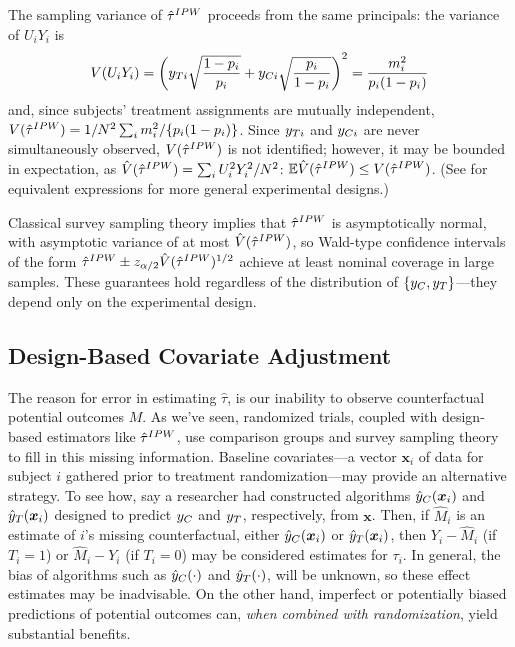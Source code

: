 The sampling variance of $\hat{\tau}^{IPW}$ proceeds from the same principals:
the variance of $U_iY_i$ is
\begin{equation}\label{eq:varTauHat1}
V(U_iY_i)=\left(y_{Ti}\sqrt{\frac{1-p_i}{p_i}}+y_{Ci}\sqrt{\frac{p_i}{1-p_i}}\right)^2=\frac{m_i^2}{p_i(1-p_i)}
\end{equation}
and, since  subjects' treatment assignments are mutually independent,
$V(\hat{\tau}^{IPW})=1/N^2\sum_im_i^2/\{p_i(1-p_i)\}$.
Since $y_{Ti} $ and $y_{Ci} $ are never simultaneously observed,
$V(\hat{\tau}^{IPW})$ is not identified; however, it may be bounded in expectation,
as $\hat{V}(\hat{\tau}^{IPW})=\sum_iU_i^2Y_i^2/N^2$:
$\mathbb{E}\hat{V}(\hat{\tau}^{IPW})\le V(\hat{\tau}^{IPW})$.
(See \citealt{aronowMiddleton} for equivalent expressions for more
general experimental designs.)

Classical survey sampling theory implies that $\hat{\tau}^{IPW}$ is
asymptotically normal, with asymptotic variance of at most
$\hat{V}(\hat{\tau}^{IPW})$, so Wald-type confidence intervals of the form
$\hat{\tau}^{IPW}\pm z_{\alpha/2}\hat{V}(\hat{\tau}^{IPW})^{1/2}$ achieve at least nominal coverage
in large samples.
These guarantees hold regardless of the distribution of
$\{y_C,y_T\}$---they depend only on the experimental design.



\subsection{Design-Based Covariate Adjustment}

The reason for error in estimating $\hat{\tau}$, is our inability to observe counterfactual
potential outcomes $M$.
As we've seen, randomized trials, coupled with design-based estimators
like $\hat{\tau}^{IPW}$, use comparison groups and survey sampling theory to
fill in this missing information.
Baseline covariates---a vector $\bm{x}_i$ of data for subject $i$
gathered prior to treatment randomization---may provide an alternative
strategy.
To see how, say a researcher had constructed algorithms $\hat{y}_C(\bm{x}_i)$ and
$\hat{y}_T(\bm{x}_i)$ designed to predict $y_C$ and $y_T$, respectively, from
$\bm{x}$.
Then, if $\hat{M}_i$ is an estimate of $i$'s missing counterfactual,
either $\hat{y}_C(\bm{x}_i)$ or $\hat{y}_T(\bm{x}_i)$, then $Y_i-\hat{M}_i$ (if $T_i=1$) or $\hat{M}_i-Y_i$ (if $T_i=0$)
may be considered estimates for $\tau_i$.
In general, the bias of algorithms such as $\hat{y}_C(\cdot)$ and
$\hat{y}_T(\cdot)$, will be unknown, so these effect estimates may be inadvisable.
On the other hand, imperfect or potentially biased predictions of
potential outcomes can, \emph{when combined with randomization}, yield
substantial benefits.

